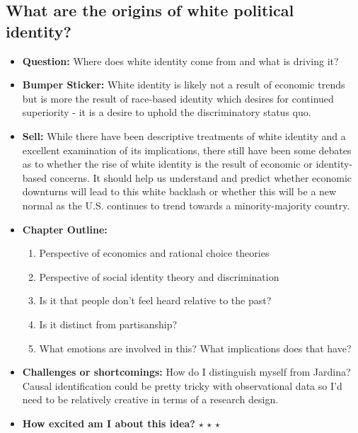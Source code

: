 \documentclass[12pt]{article}
\begin{document}
\subsection{What are the origins of white political identity?}
    \begin{itemize}
        \item \textbf{Question:} Where does white identity come from and what is driving it?
        \item \textbf{Bumper Sticker:} White identity is likely not a result of economic trends but is more the result of race-based identity which desires for continued superiority - it is a desire to uphold the discriminatory status quo.
        \item \textbf{Sell:} While there have been descriptive treatments of white identity and a excellent examination of its implications, there still have been some debates as to whether the rise of white identity is the result of economic or identity-based concerns. It should help us understand and predict whether economic downturns will lead to this white backlash or whether this will be a new normal as the U.S. continues to trend towards a minority-majority country.
        \item \textbf{Chapter Outline:}
        \begin{enumerate}
            \item Perspective of economics and rational choice theories
            \item Perspective of social identity theory and discrimination
            \item Is it that people don't feel heard relative to the past?
            \item Is it distinct from partisanship?
            \item What emotions are involved in this? What implications does that have?
        \end{enumerate}
        \item \textbf{Challenges or shortcomings:} How do I distinguish myself from Jardina? Causal identification could be pretty tricky with observational data so I'd need to be relatively creative in terms of a research design.
        \item \textbf{How excited am I about this idea?} $\star$ $\star$ $\star$
    \end{itemize}
\end{document}
